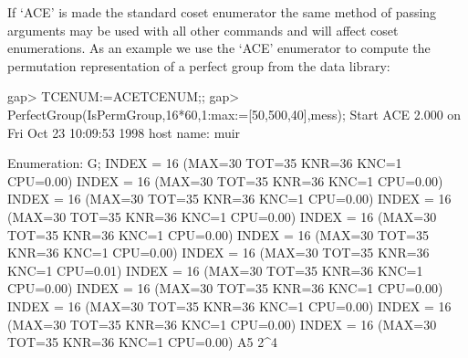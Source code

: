 If `ACE' is made the standard coset enumerator the same method of passing
arguments may be used with all other commands and will affect coset
enumerations. As an example we use the `ACE' enumerator to compute the
permutation representation of a perfect group from the data library:

\begintt
gap> TCENUM:=ACETCENUM;;
gap> PerfectGroup(IsPermGroup,16*60,1:max:=[50,500,40],mess);
Start ACE 2.000 on Fri Oct 23 10:09:53 1998
host name: muir

Enumeration: G;
INDEX = 16 (MAX=30 TOT=35 KNR=36 KNC=1 CPU=0.00)
INDEX = 16 (MAX=30 TOT=35 KNR=36 KNC=1 CPU=0.00)
INDEX = 16 (MAX=30 TOT=35 KNR=36 KNC=1 CPU=0.00)
INDEX = 16 (MAX=30 TOT=35 KNR=36 KNC=1 CPU=0.00)
INDEX = 16 (MAX=30 TOT=35 KNR=36 KNC=1 CPU=0.00)
INDEX = 16 (MAX=30 TOT=35 KNR=36 KNC=1 CPU=0.00)
INDEX = 16 (MAX=30 TOT=35 KNR=36 KNC=1 CPU=0.01)
INDEX = 16 (MAX=30 TOT=35 KNR=36 KNC=1 CPU=0.00)
INDEX = 16 (MAX=30 TOT=35 KNR=36 KNC=1 CPU=0.00)
INDEX = 16 (MAX=30 TOT=35 KNR=36 KNC=1 CPU=0.00)
INDEX = 16 (MAX=30 TOT=35 KNR=36 KNC=1 CPU=0.00)
INDEX = 16 (MAX=30 TOT=35 KNR=36 KNC=1 CPU=0.00)
A5 2^4
\endtt
